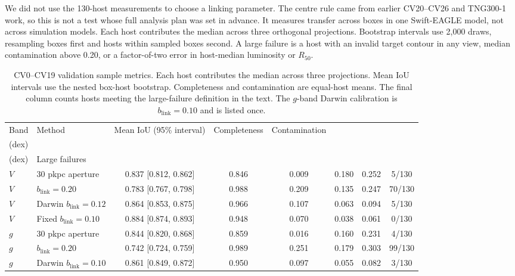 \documentclass[usenatbib]{mnras}
\begin{document}
We did not use the 130-host measurements to choose a linking parameter.
The centre rule came from earlier CV20--CV26 and TNG300-1 work, so this
is not a test whose full analysis plan was set in advance. It measures transfer across boxes in
one Swift-EAGLE model, not across simulation models. Each host contributes
the median across three orthogonal projections. Bootstrap intervals use 2,000 draws, resampling boxes first and hosts
within sampled boxes second. A large failure is a host with an invalid target
contour in any view, median contamination above 0.20, or a factor-of-two
error in host-median luminosity or $R_{50}$.

\begin{table}[t]
\centering
\footnotesize
\begingroup
\setlength{\tabcolsep}{3pt}
\begin{tabular*}{\textwidth}{@{\extracolsep{\fill}}llcccccc@{}}
\toprule
Band & Method & Mean IoU (95\% interval) & Completeness & Contamination &
\shortstack{$P_{90}(|\Delta\log L|)$\\(dex)} &
\shortstack{$P_{90}(|\Delta\log R_{50}|)$\\(dex)} & Large failures \\
\midrule
$V$ & 30 pkpc aperture & 0.837 [0.812, 0.862] & 0.846 & 0.009 & 0.180 & 0.252 & 5/130 \\
$V$ & $b_{\mathrm{link}}=0.20$ & 0.783 [0.767, 0.798] & 0.988 & 0.209 & 0.135 & 0.247 & 70/130 \\
$V$ & Darwin $b_{\mathrm{link}}=0.12$ & 0.864 [0.853, 0.875] & 0.966 & 0.107 & 0.063 & 0.094 & 5/130 \\
$V$ & Fixed $b_{\mathrm{link}}=0.10$ & 0.884 [0.874, 0.893] & 0.948 & 0.070 & 0.038 & 0.061 & 0/130 \\
$g$ & 30 pkpc aperture & 0.844 [0.820, 0.868] & 0.859 & 0.016 & 0.160 & 0.231 & 4/130 \\
$g$ & $b_{\mathrm{link}}=0.20$ & 0.742 [0.724, 0.759] & 0.989 & 0.251 & 0.179 & 0.303 & 99/130 \\
$g$ & Darwin $b_{\mathrm{link}}=0.10$ & 0.861 [0.849, 0.872] & 0.950 & 0.097 & 0.055 & 0.082 & 3/130 \\
\bottomrule
\end{tabular*}
\endgroup
\caption{CV0--CV19 validation sample metrics. Each host contributes the
median across three projections. Mean IoU intervals use the nested box-host
bootstrap. Completeness and contamination are equal-host means. The final
column counts hosts meeting the large-failure definition in the text. The
$g$-band Darwin calibration is $b_{\mathrm{link}}=0.10$ and is listed once.}
\label{tab:cv019-validation}
\end{table}
\end{document}
